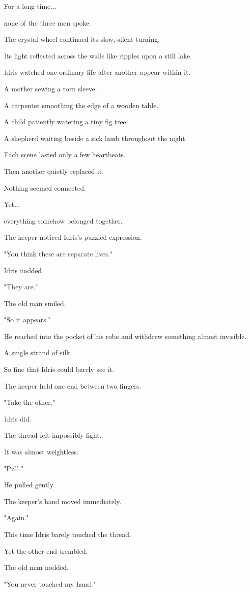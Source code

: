 \documentclass[12pt,openany]{book}
\begin{document}
For a long time...

none of the three men spoke.

The crystal wheel continued its slow, silent turning.

Its light reflected across the walls like ripples upon a still lake.

Idris watched one ordinary life after another appear within it.

A mother sewing a torn sleeve.

A carpenter smoothing the edge of a wooden table.

A child patiently watering a tiny fig tree.

A shepherd waiting beside a sick lamb throughout the night.

Each scene lasted only a few heartbeats.

Then another quietly replaced it.

Nothing seemed connected.

Yet...

everything somehow belonged together.

The keeper noticed Idris's puzzled expression.

"You think these are separate lives."

Idris nodded.

"They are."

The old man smiled.

"So it appears."

He reached into the pocket of his robe and withdrew something almost invisible.

A single strand of silk.

So fine that Idris could barely see it.

The keeper held one end between two fingers.

"Take the other."

Idris did.

The thread felt impossibly light.

It was almost weightless.

"Pull."

He pulled gently.

The keeper's hand moved immediately.

"Again."

This time Idris barely touched the thread.

Yet the other end trembled.

The old man nodded.

"You never touched my hand."
\end{document}
